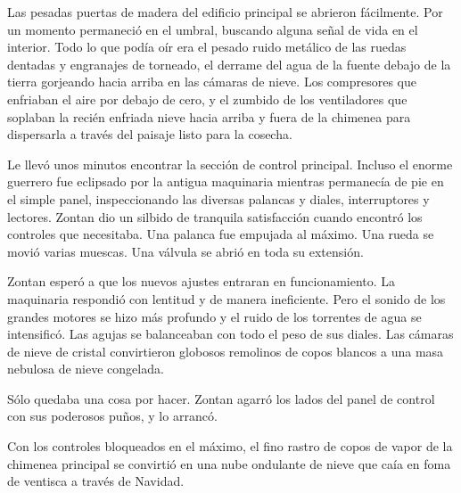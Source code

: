 Las pesadas puertas de madera del edificio principal se abrieron fácilmente. Por un momento permaneció en el umbral, buscando alguna señal de vida en el interior. Todo lo que podía oír era el pesado ruido metálico de las ruedas dentadas y engranajes de torneado, el derrame del agua de la fuente debajo de la tierra gorjeando hacia arriba en las cámaras de nieve. Los compresores que enfriaban el aire por debajo de cero, y el zumbido de los ventiladores que soplaban la recién enfriada nieve hacia arriba y fuera de la chimenea para dispersarla a través del paisaje listo para la cosecha.



Le llevó unos minutos encontrar la sección de control principal. Incluso el enorme guerrero fue eclipsado por la antigua maquinaria mientras permanecía de pie en el simple panel, inspeccionando las diversas palancas y diales, interruptores y lectores. Zontan dio un silbido de tranquila satisfacción cuando encontró los controles que necesitaba. Una palanca fue empujada al máximo. Una rueda se movió varias muescas. Una válvula se abrió en toda su extensión.



Zontan esperó a que los nuevos ajustes entraran en funcionamiento. La maquinaria respondió con lentitud y de manera ineficiente. Pero el sonido de los grandes motores se hizo más profundo y el ruido de los torrentes de agua se intensificó. Las agujas se balanceaban con todo el peso de sus diales. Las cámaras de nieve de cristal convirtieron globosos remolinos de copos blancos a una masa nebulosa de nieve congelada.



Sólo quedaba una cosa por hacer. Zontan agarró los lados del panel de control con sus poderosos puños, y lo arrancó.



Con los controles bloqueados en el máximo, el fino rastro de copos de vapor de la chimenea principal se convirtió en una nube ondulante de nieve que caía en foma de ventisca a través de Navidad.
